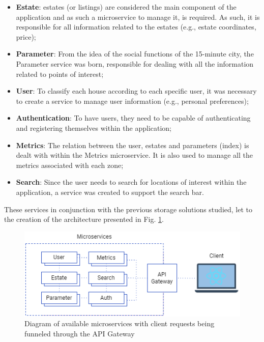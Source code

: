 \begin{itemize}
    \item \textbf{Estate}: estates (or listings) are considered the main component of the application and as such a microservice to manage it, is required. As such, it is responsible for all information related to the estates (e.g., estate coordinates, price);
    \item \textbf{Parameter}: From the idea of the social functions of the 15-minute city, the Parameter service was born, responsible for dealing with all the information related to points of interest;
    \item \textbf{User}: To classify each house according to each specific user, it was necessary to create a service to manage user information (e.g., personal preferences);
    \item \textbf{Authentication}: To have users, they need to be capable of authenticating and registering themselves within the application; 
    \item \textbf{Metrics}: The relation between the user, estates and parameters (index) is dealt with within the Metrics microservice. It is also used to manage all the metrics associated with each zone;
    \item \textbf{Search}: Since the user needs to search for locations of interest within the application, a service was created to support the search bar.
\end{itemize}

These services in conjunction with the previous storage solutions studied, let to the creation of the architecture presented in Fig. \ref{fig:microservices-overview}.

\begin{figure}
	\centering
	\includegraphics[width=1\textwidth,clip,trim=0 0 0 0]{Chapters/img/backend/ArqOverview_Focused.png}
    \caption[Microservice diagram]{Diagram of available microservices with client requests being funneled through the API Gateway} 
    \label{fig:microservices-overview}
\end{figure}


